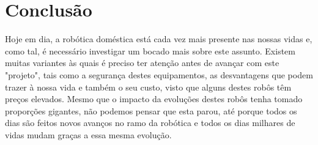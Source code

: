 \documentclass[10pt]{article}
\begin{document}
\newpage

\section{Conclusão}

\hspace{\parindent}Hoje em dia, a robótica doméstica está cada vez mais presente nas nossas vidas e, como tal, é necessário investigar um bocado mais sobre este assunto. Existem muitas variantes às quais é preciso ter atenção antes de avançar com este "projeto", tais como a segurança destes equipamentos, as desvantagens que podem trazer à nossa vida e também o seu custo, visto que alguns destes robôs têm preços elevados. Mesmo que o impacto da evoluções destes robôs tenha tomado proporções gigantes, não podemos pensar que esta parou, até porque todos os dias são feitos novos avanços no ramo da robótica e todos os dias milhares de vidas mudam graças a essa mesma evolução.

\newpage

\printbibliography[title=Referências]
\end{document}
